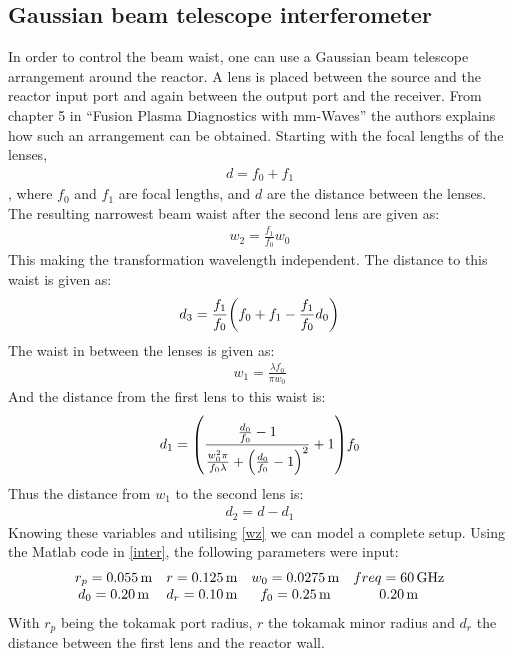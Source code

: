 \subsection{Gaussian beam telescope interferometer}
In order to control the beam waist, one can use a Gaussian beam telescope arrangement around the reactor. A lens is placed between the source and the reactor input port and again between the output port and the receiver. From chapter 5 in ``Fusion Plasma Diagnostics with mm-Waves''\cite{PlasmaDiagnosis} the authors explains how such an arrangement can be obtained. Starting with the focal lengths of the lenses,
\begin{align}
	d = f_0 + f_1
\end{align}
, where \(f_0\) and \(f_1\) are focal lengths, and \(d\) are the distance between the lenses.
The resulting narrowest beam waist after the second lens are given as:
\begin{align}
	w_2 = \frac{f_1}{f_0}w_0
\end{align}
This making the transformation wavelength independent\cite[Eq 5.118]{PlasmaDiagnosis}.
The distance to this waist is given as:
\begin{align}
	d_3 = \frac{f_1}{f_0}\pqty{f_0+f_1-\frac{f_1}{f_0}d_0}
\end{align}
The waist in between the lenses is given as:
\begin{align}
	w_1 = \frac{\lambda f_0}{\pi w_0}
\end{align}
And the distance from the first lens to this waist is:
\begin{align}
	d_1 = \pqty{\frac{\frac{d_0}{f_0}-1}{\frac{w_0^2\pi}{f_0\lambda}+\pqty{\frac{d_0}{f_0}-1}^2}+1}f_0
\end{align}
Thus the distance from \(w_1\) to the second lens is:
\begin{align}
	d_2 = d-d_1
\end{align}
Knowing these variables and utilising \cref{wz} we can model a complete setup. Using the Matlab code in \cref{inter}, the following parameters were input:
\begin{align}
	\mqty{r_p = \SI{0.055}{\meter} & r = \SI{0.125}{\meter}  & w_0 = \SI{0.0275}{\meter} & freq = \SI{60}{\giga\hertz}        \\
	d_0 = \SI{0.20}{\meter}        & d_r = \SI{0.10}{\meter} & f_0 = \SI{0.25}{\meter}   & \SI{0.20}{\meter}} \label{interin}
\end{align}
With \(r_p\) being the tokamak port radius, \(r\) the tokamak minor radius and \(d_r\) the distance between the first lens and the reactor wall.
